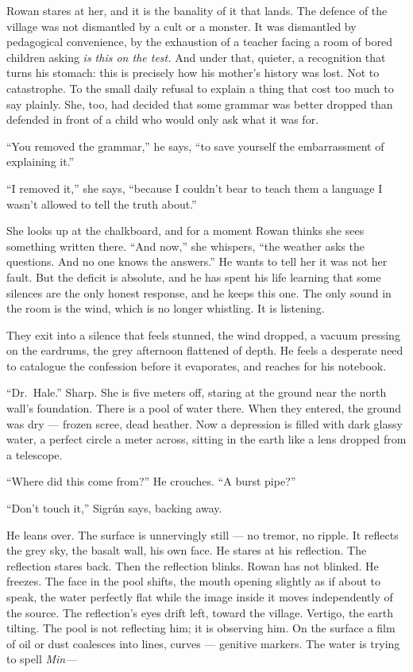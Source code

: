 \documentclass[11pt,oneside]{book}
\newcommand{\sceneline}{%
  \par\vspace{1.2em}
  \begin{center}
    \fontsize{11}{11}\selectfont \textbullet\quad\textbullet\quad\textbullet
  \end{center}
  \vspace{0.6em}\noindent\ignorespaces
}
\begin{document}
Rowan stares at her, and it is the banality of it that lands. The
defence of the village was not dismantled by a cult or a monster. It was
dismantled by pedagogical convenience, by the exhaustion of a teacher
facing a room of bored children asking \emph{is this on the test.} And
under that, quieter, a recognition that turns his stomach: this is
precisely how his mother's history was lost. Not to catastrophe. To the
small daily refusal to explain a thing that cost too much to say
plainly. She, too, had decided that some grammar was better dropped than
defended in front of a child who would only ask what it was for.

``You removed the grammar,'' he says, ``to save yourself the
embarrassment of explaining it.''

``I removed it,'' she says, ``because I couldn't bear to teach them a
language I wasn't allowed to tell the truth about.''

She looks up at the chalkboard, and for a moment Rowan thinks she sees
something written there. ``And now,'' she whispers, ``the weather asks
the questions. And no one knows the answers.'' He wants to tell her it
was not her fault. But the deficit is absolute, and he has spent his
life learning that some silences are the only honest response, and he
keeps this one. The only sound in the room is the wind, which is no
longer whistling. It is listening.

\sceneline

They exit into a silence that feels stunned, the wind dropped, a vacuum
pressing on the eardrums, the grey afternoon flattened of depth. He
feels a desperate need to catalogue the confession before it evaporates,
and reaches for his notebook.

``Dr.~Hale.'' Sharp. She is five meters off, staring at the ground near
the north wall's foundation. There is a pool of water there. When they
entered, the ground was dry --- frozen scree, dead heather. Now a
depression is filled with dark glassy water, a perfect circle a meter
across, sitting in the earth like a lens dropped from a telescope.

``Where did this come from?'' He crouches. ``A burst pipe?''

``Don't touch it,'' Sigrún says, backing away.

He leans over. The surface is unnervingly still --- no tremor, no
ripple. It reflects the grey sky, the basalt wall, his own face. He
stares at his reflection. The reflection stares back. Then the
reflection blinks. Rowan has not blinked. He freezes. The face in the
pool shifts, the mouth opening slightly as if about to speak, the water
perfectly flat while the image inside it moves independently of the
source. The reflection's eyes drift left, toward the village. Vertigo,
the earth tilting. The pool is not reflecting him; it is observing him.
On the surface a film of oil or dust coalesces into lines, curves ---
genitive markers. The water is trying to spell \emph{Min---}
\end{document}
